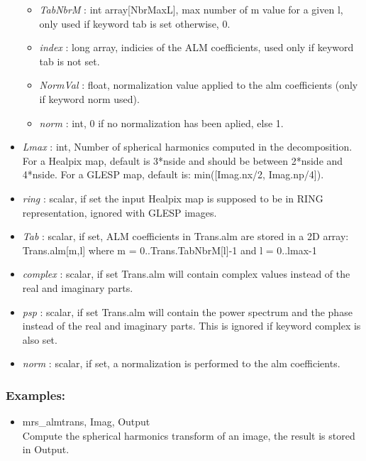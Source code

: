 \begin{itemize}
\begin{itemize}
\item {\em TabNbrM} : int array[NbrMaxL], max number of m value for a given l, only used if keyword tab is set otherwise, 0.
\item {\em index} : long array, indicies of the ALM coefficients, used only if keyword tab is not set.
\item {\em NormVal} : float, normalization value applied to the alm coefficients (only if keyword norm used).
\item {\em norm} : int, 0 if no normalization has been aplied, else 1.
\end{itemize}
\item {\em Lmax} : int, Number of spherical harmonics computed in the decomposition. For a Healpix map, default is 
3*nside and should be between 2*nside and 4*nside. For a GLESP map, default is: min([Imag.nx/2, Imag.np/4]).
\item {\em ring} : scalar, if set the input Healpix map is supposed to be in RING representation, ignored with GLESP images.
\item {\em Tab} : scalar, if set, ALM coefficients in Trans.alm are stored in a 2D array: Trans.alm[m,l] where m = 0..Trans.TabNbrM[l]-1  and l = 0..lmax-1
\item {\em complex} : scalar, if set Trans.alm will contain complex values instead of the real and imaginary parts.
\item {\em psp} : scalar, if set Trans.alm will contain the power spectrum and the phase instead of the real and imaginary parts. This is ignored if keyword complex is also set.
\item {\em norm} : scalar, if set, a normalization is performed to the alm coefficients.
\end{itemize}

\subsubsection*{Examples:} 
\begin{itemize}
\item mrs\_almtrans, Imag, Output \\
Compute the spherical harmonics transform of an image, the result is stored in Output.
\end{itemize}



